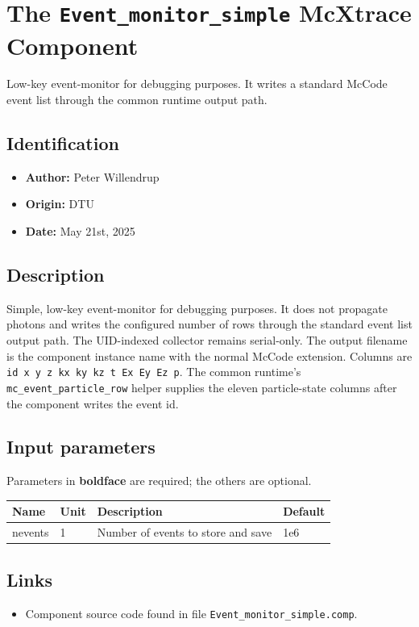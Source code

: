 \section{The \texttt{Event\_monitor\_simple} McXtrace Component}
Low-key event-monitor for debugging purposes. It writes a standard McCode
event list through the common runtime output path.

\subsection*{Identification}
\begin{itemize}
  \item \textbf{Author:} Peter Willendrup
  \item \textbf{Origin:} DTU
  \item \textbf{Date:} May 21st, 2025
\end{itemize}

\subsection*{Description}
Simple, low-key event-monitor for debugging purposes. It does not propagate
photons and writes the configured number of rows through the standard event
list output path. The UID-indexed collector remains serial-only. The output
filename is the component instance name with the normal McCode extension.
Columns are \texttt{id x y z kx ky kz t Ex Ey Ez p}. The common runtime's
\texttt{mc\_event\_particle\_row} helper supplies the eleven particle-state
columns after the component writes the event id.

\subsection*{Input parameters}
Parameters in \textbf{boldface} are required; the others are optional.

\begin{longtable}{p{}p{}p{}p{}}
\toprule
\textbf{Name} & \textbf{Unit} & \textbf{Description} & \textbf{Default} \\
\midrule
\endhead
nevents & 1 & Number of events to store and save & 1e6 \\
\bottomrule
\end{longtable}

\subsection*{Links}
\begin{itemize}
  \item Component source code found in file \texttt{Event\_monitor\_simple.comp}.
\end{itemize}

